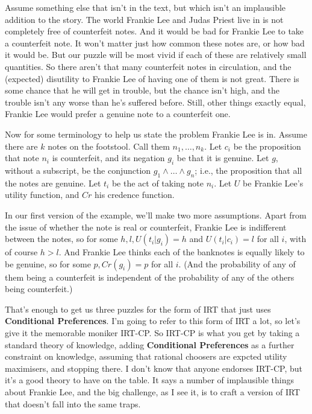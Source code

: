 \documentclass[
  12pt,
]{article}
\begin{document}
Assume something else that isn't in the text, but which isn't an implausible addition to the story. The world Frankie Lee and Judas Priest live in is not completely free of counterfeit notes. And it would be bad for Frankie Lee to take a counterfeit note. It won't matter just how common these notes are, or how bad it would be. But our puzzle will be most vivid if each of these are relatively small quantities. So there aren't that many counterfeit notes in circulation, and the (expected) disutility to Frankie Lee of having one of them is not great. There is some chance that he will get in trouble, but the chance isn't high, and the trouble isn't any worse than he's suffered before. Still, other things exactly equal, Frankie Lee would prefer a genuine note to a counterfeit one.

Now for some terminology to help us state the problem Frankie Lee is in. Assume there are \(k\) notes on the footstool. Call them \(n_1, \dots, n_k\). Let \(c_i\) be the proposition that note \(n_i\) is counterfeit, and its negation \(g_i\) be that it is genuine. Let \(g\), without a subscript, be the conjunction \(g_1 \wedge \dots \wedge g_n\); i.e., the proposition that all the notes are genuine. Let \(t_i\) be the act of taking note \(n_i\). Let \(U\) be Frankie Lee's utility function, and \(Cr\) his credence function.

In our first version of the example, we'll make two more assumptions. Apart from the issue of whether the note is real or counterfeit, Frankie Lee is indifferent between the notes, so for some \(h, l, U(t_i | g_i) = h\) and \(U(t_i | c_i) = l\) for all \(i\), with of course \(h > l\). And Frankie Lee thinks each of the banknotes is equally likely to be genuine, so for some \(p, Cr(g_i) = p\) for all \(i\). (And the probability of any of them being a counterfeit is independent of the probability of any of the others being counterfeit.)

That's enough to get us three puzzles for the form of IRT that just uses \textbf{Conditional Preferences}. I'm going to refer to this form of IRT a lot, so let's give it the memorable moniker IRT-CP. So IRT-CP is what you get by taking a standard theory of knowledge, adding \textbf{Conditional Preferences} as a further constraint on knowledge, assuming that rational choosers are expcted utility maximisers, and stopping there. I don't know that anyone endorses IRT-CP, but it's a good theory to have on the table. It says a number of implausible things about Frankie Lee, and the big challenge, as I see it, is to craft a version of IRT that doesn't fall into the same traps.
\end{document}
